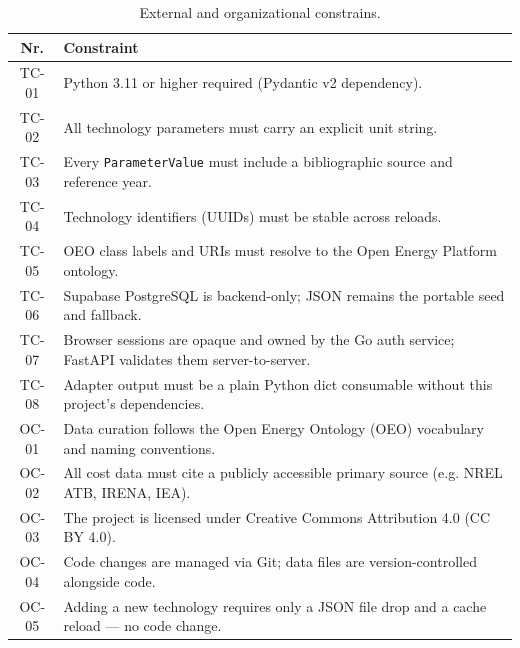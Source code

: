 \vfill
\begin{table}[h!]
    \centering
    \caption{External and organizational constrains.}
    \begin{tabular}{c l} 
        \toprule
        Nr. & Constraint \\ [0.5ex] 
        \midrule
        TC-01 & Python 3.11 or higher required (Pydantic v2 dependency). \\ [1ex]
        TC-02 & All technology parameters must carry an explicit unit string. \\ [1ex]
        TC-03 & Every \texttt{ParameterValue} must include a bibliographic source and reference year. \\ [1ex]
        TC-04 & Technology identifiers (UUIDs) must be stable across reloads. \\ [1ex]
        TC-05 & OEO class labels and URIs must resolve to the Open Energy Platform ontology. \\ [1ex]
        TC-06 & Supabase PostgreSQL is backend-only; JSON remains the portable seed and fallback. \\ [1ex]
        TC-07 & Browser sessions are opaque and owned by the Go auth service; FastAPI validates them server-to-server. \\ [1ex]
        TC-08 & Adapter output must be a plain Python dict consumable without this project's dependencies. \\ [1ex]
        OC-01 & Data curation follows the Open Energy Ontology (OEO) vocabulary and naming conventions. \\ [1ex]
        OC-02 & All cost data must cite a publicly accessible primary source (e.g. NREL ATB, IRENA, IEA). \\ [1ex]
        OC-03 & The project is licensed under Creative Commons Attribution 4.0 (CC BY 4.0). \\ [1ex]
        OC-04 & Code changes are managed via Git; data files are version-controlled alongside code. \\ [1ex]
        OC-05 & Adding a new technology requires only a JSON file drop and a cache reload — no code change. \\ [1ex] 
        \bottomrule
    \end{tabular}
    \label{table:2}
\end{table}
\vfill
